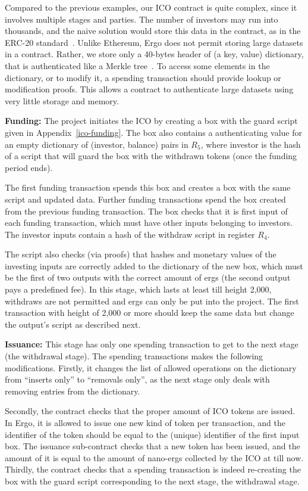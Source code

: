 \documentclass[runningheads]{llncs}
\begin{document}
Compared to the previous examples, our ICO contract is quite complex, since it involves multiple stages and parties. 
The number of investors may run into thousands, and the naive solution would store this data in the contract, as in the ERC-20 standard~\cite{erc20}. 
Unlike Ethereum, Ergo does not permit storing large datasets in a contract. Rather, we store only a 40-bytes header of (a key, value) dictionary, that is authenticated like a Merkle tree~\cite{RMCI17}. To access some elements in the dictionary, or to modify it, a spending transaction should provide lookup or modification proofs. This allows a contract to authenticate large datasets using very little storage and memory. 

\textbf{Funding:} 
The project initiates the ICO by creating a box with the guard script given in Appendix~\ref{ico-funding}. The box also contains a authenticating value for an empty dictionary of (investor, balance) pairs in $R_5$, where investor is the hash of a script that will guard the box with the withdrawn tokens (once the funding period ends). 

The first funding transaction spends this box and creates a box with the same script and updated data. Further funding transactions spend the box created from the previous funding transaction. The box checks that it is first input of each funding transaction, which must have other inputs belonging to investors. The investor inputs contain a hash of the withdraw script in register $R_4$. 

The script also checks (via proofs) that hashes and monetary values of the investing inputs are correctly added to the dictionary of the new box, which must be the first of two outputs with the correct amount of ergs (the second output pays a predefined fee). 
In this stage, which lasts at least till height 2,000, withdraws are not permitted and ergs can only be put into the project. 
The first transaction with height of 2,000 or more should keep the same data but change the output's script as described next.

\textbf{Issuance:}
This stage has only one spending transaction to get to the next stage (the withdrawal stage). The spending transactions makes the following modifications. Firstly, it changes the list of allowed operations on the dictionary from ``inserts only'' to ``removals only'', as the next stage only deals with removing entries from the dictionary.

Secondly, the contract checks that the proper amount of ICO tokens are issued. In Ergo, it is allowed to issue one new kind of token per transaction, and the identifier of the token should be equal to the (unique) identifier of the first input box. The issuance sub-contract checks that a new token has been issued, and the amount of it is equal to the amount of nano-ergs collected by the ICO at till now. Thirdly, the contract checks that a spending transaction is indeed re-creating the box with the guard script corresponding to the next stage, the withdrawal stage.
\end{document}
